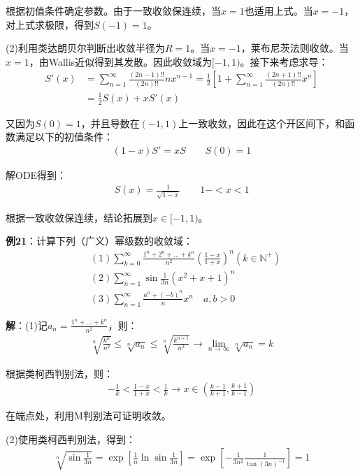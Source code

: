 \documentclass{ctexart}
\let\oldtextbf\textbf
\renewcommand{\textbf}[1]{\textcolor{brown!50!red}{\oldtextbf{#1}}}
\begin{document}
根据初值条件确定参数。由于一致收敛保连续，当$x=1$也适用上式。当$x=-1$，对上式求极限，得到$S(-1)=1$。

(2)利用类达朗贝尔判断出收敛半径为$R=1$。当$x=-1$，莱布尼茨法则收敛。当$x=1$，由Wallis近似得到其发散。因此收敛域为$[-1,1)$。接下来考虑求导：
\begin{align*}
    S'(x)&=\sum_{n=1}^\infty \frac{(2n-1)!!}{(2n)!!}nx^{n-1}=\frac{1}{2}\left[
1+\sum_{n=1}^\infty \frac{(2n+1)!!}{(2n)!!} x^n\right]\\
&=\frac{1}{2}S(x)+xS'(x)  
\end{align*}

又因为$S(0)=1$，并且导数在$(-1,1)$上一致收敛，因此在这个开区间下，和函数满足以下的初值条件：
\begin{align*}
(1-x)S'=xS\qquad S(0)=1
\end{align*}

解ODE得到：
\begin{align*}
    S(x)=\frac{1}{\sqrt{1-x}}\qquad 1-<x<1
\end{align*}

根据一致收敛保连续，结论拓展到$x\in[-1,1)$。

\textbf{\color{brown!50!red}例21}：计算下列（广义）幂级数的收敛域：
\begin{align*}
   & (1)\sum_{k=0}^\infty \frac{1^n+2^n+...+k^n}{n^2} (\frac{1-x}{1+x} )^n (k\in\mathbb{N^+})\\
&(2)\sum _{n=1}^\infty \sin\frac{1}{3n}(x^2+x+1)^n  \\
&(3) \sum_{n=1}^\infty \frac{a^n+(-b)^n}{n}x^n \quad a,b>0 
\end{align*}

\textbf{\color{brown!50!red}解}：(1)记$a_n=\frac{1^n+...+k^n}{n^2}$，则：
\begin{align*}
  \sqrt[n]{\frac{k^n}{n^2} }\leq \sqrt[n]{a_n}\leq\sqrt[n]{\frac
{k^{n+1}}{n^2}} \to\lim_{n\to\infty}\sqrt[n]{a_n}=k  
\end{align*}

根据类柯西判别法，则：
\begin{align*}
    -\frac{1}{k}<\frac{1-x}{1+x}<\frac{1}{k}\to x\in(\frac{k-1}{k+1},\frac{k+1}{k-1})
\end{align*}

在端点处，利用M判别法可证明收敛。

(2)使用类柯西判别法，得到：
\begin{align*}
  \sqrt[n]{\sin\frac{1}{3n}}=\exp[\frac{1}{n}\ln\sin\frac{1}{3n}  ]=\exp[-\frac{1}{3n^2}\frac{1}
{\tan(3n)^{-1}}  ]=1
\end{align*}
\end{document}
